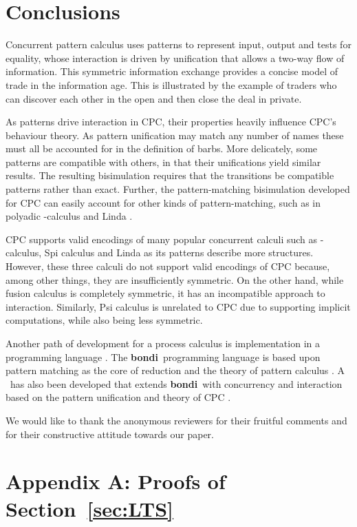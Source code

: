 \documentclass{LMCS}
\def\bondi{{\bf bondi}}
\begin{document}
\section{Conclusions} \label{sec:conclusions}

Concurrent pattern calculus uses patterns to represent input,
output and tests for equality, whose interaction is driven by
unification that allows a two-way flow of information.  This symmetric
information exchange provides a concise model of trade in the
information age.  This is illustrated by the example of traders who
can discover each other in the open and then close the deal
in private.

As patterns drive interaction in CPC, 
their properties heavily influence CPC's behaviour theory. As pattern
unification may match any number of names these must all be accounted
for in the definition of barbs. More delicately, some patterns are
compatible with others, in that their unifications yield similar results.
The resulting  bisimulation requires that the transitions be compatible
patterns rather than exact.
Further, the pattern-matching bisimulation developed for CPC can easily account
for other kinds of pattern-matching, such as in polyadic -calculus and
Linda \cite{GivenWilsonGorla13}.

CPC supports valid encodings of many popular concurrent calculi such
as -calculus, Spi calculus and Linda as its patterns describe
more structures. However, these three calculi do not support valid
encodings of CPC because, among other things, they are insufficiently
symmetric. On the other hand, while fusion calculus is completely
symmetric, it has an incompatible approach to interaction.
Similarly, Psi calculus is unrelated to CPC due to supporting implicit
computations, while also being less symmetric.


Another path of development for a process calculus is implementation in a
programming language \cite{Pierce97pict:a,Klava,cpplinda,20110201:jocaml}.
The \bondi\ programming language is based upon pattern matching as the core
of reduction and the theory of pattern calculus \cite{pcb,bondi}. A
\cbondi\ has also been developed that extends \bondi\ with concurrency
and interaction based on the pattern unification and theory of CPC
\cite{GivenWilsonPHD,cbondi}.

\bigskip
{} We would like to thank the anonymous reviewers for their
fruitful comments and for their constructive attitude towards our paper.

\section*{Appendix A: Proofs of Section~\ref{sec:LTS}}
\end{document}
